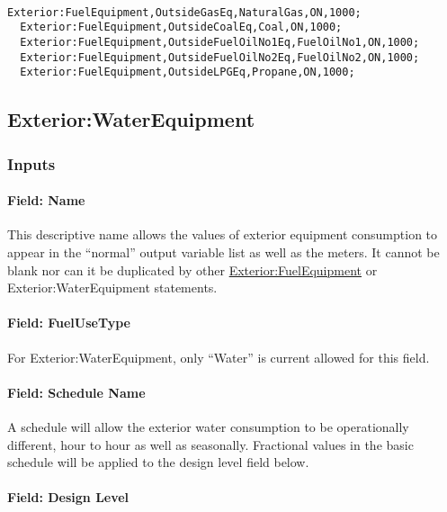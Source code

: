 \begin{lstlisting}

Exterior:FuelEquipment,OutsideGasEq,NaturalGas,ON,1000;
  Exterior:FuelEquipment,OutsideCoalEq,Coal,ON,1000;
  Exterior:FuelEquipment,OutsideFuelOilNo1Eq,FuelOilNo1,ON,1000;
  Exterior:FuelEquipment,OutsideFuelOilNo2Eq,FuelOilNo2,ON,1000;
  Exterior:FuelEquipment,OutsideLPGEq,Propane,ON,1000;
\end{lstlisting}

\subsection{Exterior:WaterEquipment}\label{exteriorwaterequipment}

\subsubsection{Inputs}\label{inputs-2-014}

\paragraph{Field: Name}\label{field-name-2-013}

This descriptive name allows the values of exterior equipment consumption to appear in the ``normal'' output variable list as well as the meters. It cannot be blank nor can it be duplicated by other \hyperref[exteriorfuelequipment]{Exterior:FuelEquipment} or Exterior:WaterEquipment statements.

\paragraph{Field: FuelUseType}\label{field-fuelusetype}

For Exterior:WaterEquipment, only ``Water'' is current allowed for this field.

\paragraph{Field: Schedule Name}\label{field-schedule-name-2-000}

A schedule will allow the exterior water consumption to be operationally different, hour to hour as well as seasonally. Fractional values in the basic schedule will be applied to the design level field below.

\paragraph{Field: Design Level}\label{field-design-level-2}

